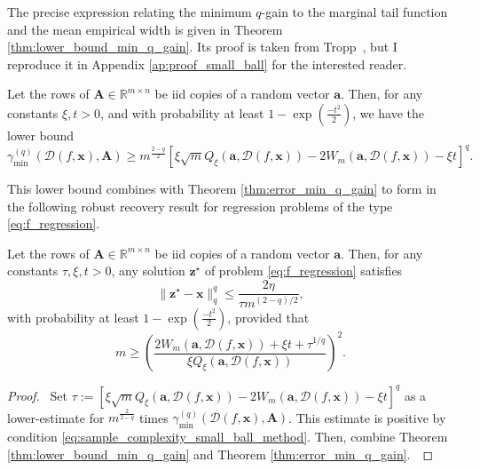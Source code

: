 The precise expression relating the minimum $q$-gain to the marginal tail function and the mean empirical width is given in Theorem \ref{thm:lower_bound_min_q_gain}. Its proof is taken from Tropp~\cite{tropp2015a}, but I reproduce it in Appendix \ref{ap:proof_small_ball} for the interested reader.

\begin{theorem}\label{thm:lower_bound_min_q_gain}
    Let the rows of $\mathbf{A} \in \mathbb{R}^{m \times n}$ be \acrshort{iid} copies of a random vector $\mathbf{a}$. Then, for any constants $\xi, t > 0$, and with probability at least $1 - \exp \left ( \frac{-t^2}{2} \right )$, we have the lower bound
    \begin{equation}
        \gamma_{\min}^{(q)} \left ( \mathcal{D}( f, \mathbf{x}), \mathbf{A} \right) \geq m^{\frac{2 - q}{2}} \left [ \xi \sqrt{m} Q_{\xi}(\mathbf{a}, \mathcal{D}( f, \mathbf{x})) - 2 W_{m}(\mathbf{a}, \mathcal{D}( f, \mathbf{x})) - \xi t \right ]^{q}.
    \end{equation}
\end{theorem}

This lower bound combines with Theorem \ref{thm:error_min_q_gain} to form in the following robust recovery result for regression problems of the type \eqref{eq:f_regression}.

\begin{corollary}\label{cor:sample_complexity_small_ball_method}
    Let the rows of $\mathbf{A} \in \mathbb{R}^{m \times n}$ be \acrshort{iid} copies of a random vector $\mathbf{a}$. Then, for any constants $\tau, \xi, t > 0$, any solution $\mathbf{z}^\star$ of problem \eqref{eq:f_regression} satisfies
    \begin{equation}
        \| \mathbf{z}^\star - \mathbf{x}\|_q^q \leq \frac{2 \eta}{\tau m^{(2 - q)/2}},
    \end{equation}
    with probability at least $1 - \exp \left ( \frac{-t^2}{2} \right )$, provided that
    \begin{equation}
        m \geq \left ( \frac{2 W_{m}(\mathbf{a}, \mathcal{D}( f, \mathbf{x})) + \xi t + \tau^{1/q}}{\xi Q_{\xi}(\mathbf{a}, \mathcal{D}( f, \mathbf{x}))} \right )^2.
        \label{eq:sample_complexity_small_ball_method}
    \end{equation}
\end{corollary}

\begin{proof}
    \pf\ Set $\tau := \left [ \xi \sqrt{m} Q_{\xi}(\mathbf{a}, \mathcal{D}( f, \mathbf{x})) - 2 W_{m}(\mathbf{a}, \mathcal{D}( f, \mathbf{x})) - \xi t \right ]^{q}$ as a lower-estimate for $m^{\frac{2}{2 - q}}$ times $\gamma_{\min}^{(q)} \left ( \mathcal{D}( f, \mathbf{x}), \mathbf{A} \right )$. This estimate is positive by condition \eqref{eq:sample_complexity_small_ball_method}. Then, combine Theorem \ref{thm:lower_bound_min_q_gain} and Theorem \ref{thm:error_min_q_gain}.~\qedsymbol
\end{proof}

